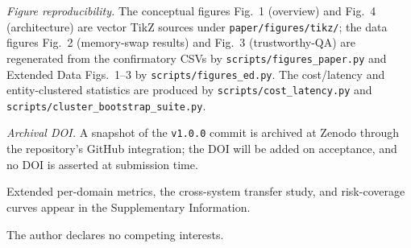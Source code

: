 \documentclass[pdflatex,sn-nature]{sn-jnl}
\begin{document}
\textit{Figure reproducibility.} The conceptual figures Fig.~1 (overview) and
Fig.~4 (architecture) are vector TikZ sources under \texttt{paper/figures/tikz/};
the data figures Fig.~2 (memory-swap results) and Fig.~3 (trustworthy-QA) are
regenerated from the confirmatory CSVs by \texttt{scripts/figures\_paper.py} and
Extended Data Figs.~1--3 by \texttt{scripts/figures\_ed.py}. The cost/latency and
entity-clustered statistics are produced by \texttt{scripts/cost\_latency.py} and
\texttt{scripts/cluster\_bootstrap\_suite.py}.

\textit{Archival DOI.} A snapshot of the \texttt{v1.0.0} commit is archived at
Zenodo through the repository's GitHub integration; the DOI will be added on
acceptance, and no DOI is asserted at submission time.

Extended per-domain metrics, the cross-system transfer study, and risk-coverage
curves appear in the Supplementary Information.

The author declares no competing interests.


\end{document}
